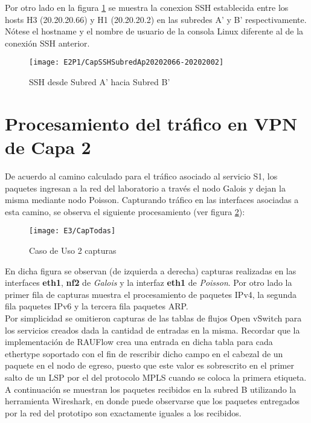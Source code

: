 Por otro lado en la figura \ref{fig:CapSSHSApSBp} se muestra la conexion SSH establecida entre los hosts H3 (20.20.20.66) y H1 (20.20.20.2) en las subredes A' y B' respectivamente. N\'otese el hostname y el nombre de usuario de la consola Linux diferente al de la conexi\'on SSH anterior. 

\newpage
\begin{figure}[ht!] 
\centering    
\texttt{[image: E2P1/CapSSHSubredAp20202066-20202002]}
\caption[SSH desde Subred A' hacia Subred B']{SSH desde Subred A' hacia Subred B'}
\label{fig:CapSSHSApSBp}
\end{figure}

\section{Procesamiento del tr\'afico en VPN de Capa 2}
\label{appendix6.5}

De acuerdo al camino calculado para el tr\'afico asociado al servicio S1, los paquetes ingresan a la red del laboratorio a través el nodo Galois y dejan la misma mediante nodo Poisson. Capturando tr\'afico en las interfaces asociadas a esta camino, se observa el siguiente procesamiento (ver figura \ref{fig:CapturaTCP}):

\begin{figure}[h!] 
\centering    
\texttt{[image: E3/CapTodas]}
\caption[Caso de Uso 2 capturas]{Caso de Uso 2 capturas}
\label{fig:CapturaTCP}
\end{figure}

En dicha figura se observan (de izquierda a derecha) capturas realizadas en las interfaces \textbf{eth1}, \textbf{nf2} de \textit{Galois} y la interfaz \textbf{eth1} de \textit{Poisson}. Por otro lado la primer fila de capturas muestra el procesamiento de paquetes IPv4, la segunda fila paquetes IPv6 y la tercera fila paquetes ARP.\\

Por simplicidad se omitieron capturas de las tablas de flujos Open vSwitch para los servicios creados dada la cantidad de entradas en la misma. Recordar que la implementaci\'on de RAUFlow crea una entrada en dicha tabla para cada ethertype soportado con el fin de rescribir dicho campo en el cabezal de un paquete en el nodo de egreso, puesto que este valor es sobrescrito en el primer salto de un LSP por el del protocolo MPLS cuando se coloca la primera etiqueta.\\

A continuaci\'on se muestran los paquetes recibidos en la subred B utilizando la herramienta Wireshark, en donde puede observarse que los paquetes entregados por la red del prototipo son exactamente iguales a los recibidos.

